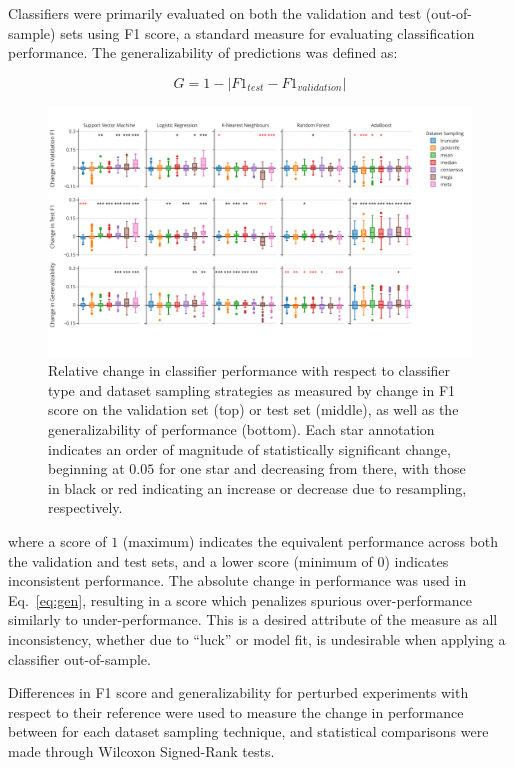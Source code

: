 \documentclass[10pt]{SelfArx} %
\begin{document}
Classifiers were primarily evaluated on both the validation and test (out-of-sample) sets using F1 score, a standard
measure for evaluating classification performance. The generalizability of predictions was defined as:

\begin{equation}
G = 1 - \lvert F1_{test} - F1_{validation} \rvert
\label{eq:gen}
\end{equation}

\begin{figure}[bth!]\centering
\includegraphics[width=\linewidth]{figures/1.pdf}
\caption{Relative change in classifier performance with respect to classifier type and dataset sampling strategies as
measured by change in F1 score on the validation set (top) or test set (middle), as well as the generalizability of
performance (bottom). Each star annotation indicates an order of magnitude of statistically significant change,
beginning at $0.05$ for one star and decreasing from there, with those in black or red indicating an increase or
decrease due to resampling, respectively.}
\label{fig:overall_perf}
\end{figure}

where a score of $1$ (maximum) indicates the equivalent performance across both the validation and test sets, and a
lower score (minimum of $0$) indicates inconsistent performance. The absolute change in performance was used in
Eq.~\ref{eq:gen}, resulting in a score which penalizes spurious over-performance similarly to under-performance. This
is a desired attribute of the measure as all inconsistency, whether due to ``luck'' or model fit, is undesirable when
applying a classifier out-of-sample.

Differences in F1 score and generalizability for perturbed experiments with respect to their reference were used to
measure the change in performance between for each dataset sampling technique, and statistical comparisons were made
through Wilcoxon Signed-Rank tests.
\end{document}
